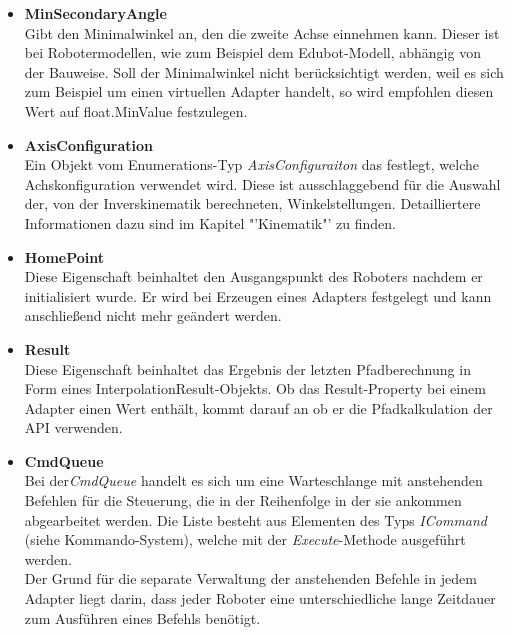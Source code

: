 \begin{itemize}
\item \textbf{MinSecondaryAngle}\\
Gibt den Minimalwinkel an, den die zweite Achse einnehmen kann. Dieser ist bei Robotermodellen, wie zum Beispiel dem Edubot-Modell, abhängig von der Bauweise. Soll der Minimalwinkel nicht berücksichtigt werden, weil es sich zum Beispiel um einen virtuellen Adapter handelt, so wird empfohlen diesen Wert auf float.MinValue festzulegen.
\item \textbf{AxisConfiguration}\\
Ein Objekt vom Enumerations-Typ \textit{AxisConfiguraiton} das festlegt, welche Achskonfiguration verwendet wird. Diese ist ausschlaggebend für die Auswahl der, von der Inverskinematik berechneten, Winkelstellungen. Detailliertere Informationen dazu sind im Kapitel "'Kinematik"' zu finden.
\item \textbf{HomePoint}\\
Diese Eigenschaft beinhaltet den Ausgangspunkt des Roboters nachdem er initialisiert wurde. Er wird bei Erzeugen eines Adapters festgelegt und kann anschließend nicht mehr geändert werden.
\item \textbf{Result}\\
Diese Eigenschaft beinhaltet das Ergebnis der letzten Pfadberechnung in Form eines InterpolationResult-Objekts. Ob das Result-Property bei einem Adapter einen Wert enthält, kommt darauf an ob er die Pfadkalkulation der API verwenden. 
\item \textbf{CmdQueue}\\
Bei der\textit{CmdQueue} handelt es sich um eine Warteschlange mit anstehenden Befehlen für die Steuerung, die in der Reihenfolge in der sie ankommen abgearbeitet werden. Die Liste besteht aus Elementen des Typs \textit{ICommand} (siehe Kommando-System), welche mit der \textit{Execute}-Methode ausgeführt werden.\\
Der Grund für die separate Verwaltung der anstehenden Befehle in jedem Adapter liegt darin, dass jeder Roboter eine unterschiedliche lange Zeitdauer zum Ausführen eines Befehls benötigt.
\end{itemize}

